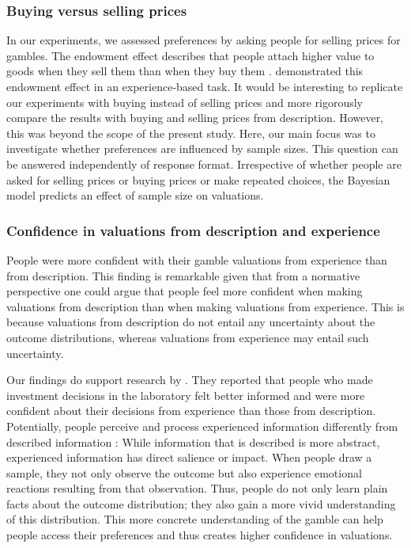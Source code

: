 \documentclass[a4paper, man, natbib, floatsintext]{apa6} %
\begin{document}
\subsubsection{Buying versus selling prices}
In our experiments, we assessed preferences by asking people for selling prices for gambles. 
The endowment effect describes that people attach higher value to goods when they sell them than when they buy them \citep{Thaler1980}. \cite{Pachur2012} demonstrated this endowment effect in an experience-based task. It would be interesting to replicate our experiments with buying instead of selling prices and more rigorously compare the results with buying and selling prices from description. However, this was beyond the scope of the present study. Here, our main focus was to investigate whether preferences are influenced by sample sizes. This question can be answered independently of response format. Irrespective of whether people are asked for selling prices or buying prices or make repeated choices, the Bayesian model predicts an effect of sample size on valuations. 

\subsubsection{Confidence in valuations from description and experience}
People were more confident with their gamble valuations from experience than from description. This finding is remarkable given that from a normative perspective one could argue that people feel more confident when making valuations from description than when making valuations from experience. This is because valuations from description do not entail any uncertainty about the outcome distributions, whereas valuations from experience may entail such uncertainty.

Our findings do support research by \cite{Bradbury2014}. They reported that people who made investment decisions in the laboratory felt better informed and were more confident about their decisions from experience than those from description.
Potentially, people perceive and process experienced information differently from described information \citep{Kahneman2009}: 
While information that is described is more abstract, experienced information has direct salience or impact. When people draw a sample, they not only observe the outcome but also experience emotional reactions resulting from that observation. Thus, people do not only learn plain facts about the outcome distribution; they also gain a more vivid understanding of this distribution. This more concrete understanding of the gamble can help people access their preferences and thus creates higher confidence in valuations.
\end{document}
